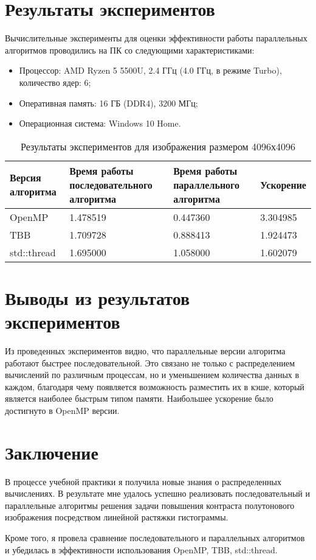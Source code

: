 \documentclass{report}
\begin{document}
\section*{Результаты экспериментов}
Вычислительные эксперименты для оценки эффективности работы параллельных алгоритмов проводились на ПК со следующими характеристиками:
\begin{itemize}
\item Процессор: AMD Ryzen 5 5500U, 2.4 ГГц (4.0 ГГц, в режиме Turbo), количество ядер: 6;
\item Оперативная память: 16 ГБ (DDR4), 3200 МГц;
\item Операционная система: Windows 10 Home.
\end{itemize}
\begin{table}[!h]
\caption{Результаты экспериментов для изображения размером 4096х4096}
\centering
\begin{tabular}{| p{2cm} | p{3cm} | p{4cm} | p{2cm} |}
\hline
Версия алгоритма & Время работы последовательного алгоритма & Время работы параллельного алгоритма & Ускорение  \\[5pt]
\hline
OpenMP        & 1.478519         & 0.447360        & 3.304985         \\
TBB           & 1.709728         & 0.888413        & 1.924473         \\
std::thread   & 1.695000         & 1.058000        & 1.602079         \\

\hline
\end{tabular}
\end{table}
\newpage

\section*{Выводы из результатов экспериментов}
 Из проведенных экспериментов видно, что параллельные версии алгоритма работают быстрее последовательной. Это связано не только с распределением вычислений по различным процессам, но и уменьшением количества данных в каждом, благодаря чему появляется возможность разместить их в кэше, который является наиболее быстрым типом памяти. Наибольшее ускорение было достигнуто в OpenMP версии.
\newpage

\section*{Заключение}
В процессе учебной практики я получила новые знания о распределенных вычислениях. В результате мне удалось успешно реализовать последовательный и параллельные алгоритмы решения задачи повышения контраста полутонового изображения посредством линейной растяжки гистограммы. 
\par Кроме того, я провела сравнение последовательного и параллельных алгоритмов и убедилась в эффективности использования OpenMP, TBB, std::thread.
\newpage
\end{document}
